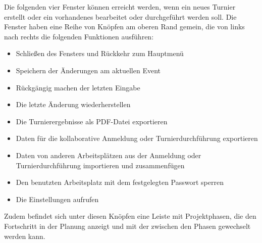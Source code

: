 \documentclass[11pt]{article}
\begin{document}

\vspace{1cm}

Die folgenden vier Fenster können erreicht werden, wenn ein neues Turnier erstellt oder ein vorhandenes bearbeitet oder durchgeführt werden soll. Die Fenster haben eine Reihe von Knöpfen am oberen Rand gemein, die von links nach rechts die folgenden Funktionen ausführen:
\newpage
\begin{itemize}
	\item Schließen des Fensters und Rückkehr zum Hauptmenü
	\item Speichern der Änderungen am aktuellen Event
	\item Rückgängig machen der letzten Eingabe
	\item Die letzte Änderung wiederherstellen
	\item Die Turnierergebnisse als PDF-Datei exportieren
	\item Daten für die kollaborative Anmeldung oder Turnierdurchführung exportieren
	\item Daten von anderen Arbeitsplätzen aus der Anmeldung oder Turnierdurchführung importieren und zusammenfügen
	\item Den benutzten Arbeitsplatz mit dem festgelegten Passwort sperren
	\item Die Einstellungen aufrufen
\end{itemize}
Zudem befindet sich unter diesen Knöpfen eine Leiste mit Projektphasen, die den Fortschritt in der Planung anzeigt und mit der zwischen den Phasen gewechselt werden kann.
\end{document}
